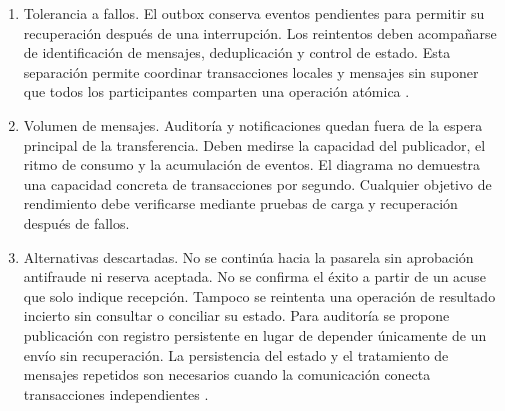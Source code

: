\documentclass[12pt,a4paper]{article}
\begin{document}
\begin{enumerate}
    \item Tolerancia a fallos.
    El outbox conserva eventos pendientes para permitir
    su recuperación después de una interrupción. Los
    reintentos deben acompañarse de identificación de
    mensajes, deduplicación y control de estado.
    Esta separación permite coordinar transacciones
    locales y mensajes sin suponer que todos los
    participantes comparten una operación atómica
    \cite{helland2017}.

    \item Volumen de mensajes.
    Auditoría y notificaciones quedan fuera de la espera
    principal de la transferencia. Deben medirse la
    capacidad del publicador, el ritmo de consumo y la
    acumulación de eventos. El diagrama no demuestra una
    capacidad concreta de transacciones por segundo.
    Cualquier objetivo de rendimiento debe verificarse
    mediante pruebas de carga y recuperación después
    de fallos.

    \item Alternativas descartadas.
    No se continúa hacia la pasarela sin aprobación
    antifraude ni reserva aceptada. No se confirma el éxito
    a partir de un acuse que solo indique recepción.
    Tampoco se reintenta una operación de resultado incierto
    sin consultar o conciliar su estado. Para auditoría se
    propone publicación con registro persistente en lugar
    de depender únicamente de un envío sin recuperación.
    La persistencia del estado y el tratamiento de mensajes
    repetidos son necesarios cuando la comunicación conecta
    transacciones independientes \cite{helland2017}.

\end{enumerate}
\end{document}
